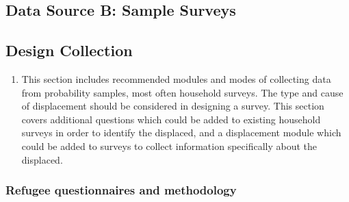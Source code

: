 \documentclass[
]{article}
\providecommand{\tightlist}{%
  \setlength{\itemsep}{0pt}\setlength{\parskip}{0pt}}
\begin{document}
\hypertarget{data-source-b-sample-surveys-1}{%
\subsection{Data Source B: Sample Surveys}\label{data-source-b-sample-surveys-1}}

\hypertarget{design-collection-5}{%
\subsection{Design Collection}\label{design-collection-5}}

\begin{enumerate}
\def\labelenumi{\arabic{enumi}.}
\setcounter{enumi}{120}
\tightlist
\item
  This section includes recommended modules and modes of collecting
  data from probability samples, most often household surveys. The
  type and cause of displacement should be considered in designing a
  survey. This section covers additional questions which could be
  added to existing household surveys in order to identify the
  displaced, and a displacement module which could be added to surveys
  to collect information specifically about the displaced.
\end{enumerate}

\hypertarget{b.1.-refugee-questionnaires-and-methodology}{%
\subsubsection{Refugee questionnaires and methodology}\label{b.1.-refugee-questionnaires-and-methodology}}
\end{document}
